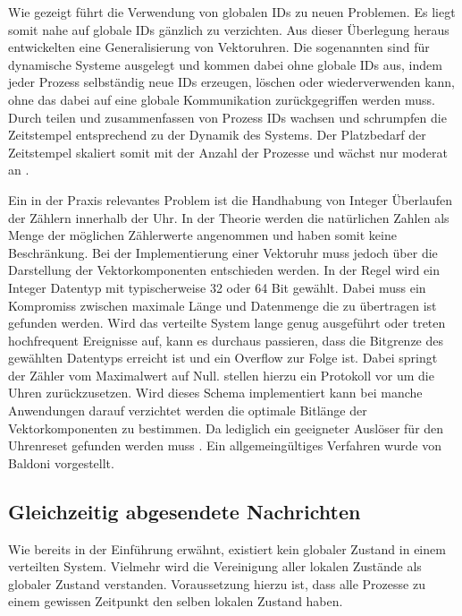 
Wie gezeigt führt die Verwendung von globalen IDs zu neuen Problemen.
Es liegt somit nahe auf globale IDs gänzlich zu verzichten.
Aus dieser Überlegung heraus entwickelten  \cite{almeida2008treeclocks} eine Generalisierung von Vektoruhren.
Die sogenannten  sind für dynamische Systeme ausgelegt und kommen dabei ohne globale IDs aus, indem jeder Prozess selbständig neue IDs erzeugen, löschen oder wiederverwenden kann, ohne das dabei auf eine globale Kommunikation zurückgegriffen werden muss.
Durch teilen und zusammenfassen von Prozess IDs wachsen und schrumpfen die Zeitstempel entsprechend zu der Dynamik des Systems.
Der Platzbedarf der Zeitstempel skaliert somit mit der Anzahl der Prozesse und wächst nur moderat an \cite{almeida2008treeclocks}.


Ein in der Praxis relevantes Problem ist die Handhabung von Integer Überlaufen der Zählern innerhalb der Uhr.
In der Theorie werden die natürlichen Zahlen als Menge der möglichen Zählerwerte angenommen und haben somit keine Beschränkung.
Bei der Implementierung einer Vektoruhr muss jedoch über die Darstellung der Vektorkomponenten entschieden werden.
In der Regel wird ein Integer Datentyp mit typischerweise 32 oder 64 Bit gewählt.
Dabei muss ein Kompromiss zwischen maximale Länge und Datenmenge die zu übertragen ist gefunden werden.
Wird das verteilte System lange genug ausgeführt oder treten hochfrequent Ereignisse auf, kann es durchaus passieren, dass die Bitgrenze des gewählten Datentyps erreicht ist und ein Overflow zur Folge ist.
Dabei springt der Zähler vom Maximalwert auf Null.
 \cite{yen1997resetting} stellen hierzu ein Protokoll vor um die Uhren zurückzusetzen.
Wird dieses Schema implementiert kann bei manche Anwendungen darauf verzichtet werden die optimale Bitlänge der Vektorkomponenten zu bestimmen. Da lediglich ein geeigneter Auslöser für den Uhrenreset gefunden werden muss \cite{yen1997resetting}.
Ein allgemeingültiges Verfahren wurde von Baldoni \cite{baldoni1998positive} vorgestellt.

\subsection{Gleichzeitig abgesendete Nachrichten}
\label{lbl:consistency}
Wie bereits in der Einführung erwähnt, existiert kein globaler Zustand in einem verteilten System.
Vielmehr wird die Vereinigung aller lokalen Zustände als globaler Zustand verstanden.
Voraussetzung hierzu ist, dass alle Prozesse zu einem gewissen Zeitpunkt den selben lokalen Zustand haben.

